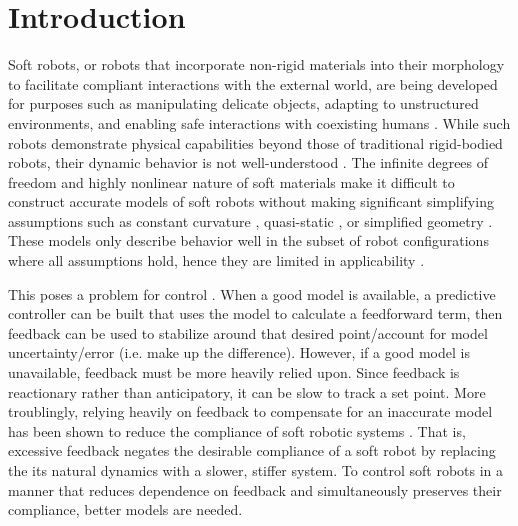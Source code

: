 \section{Introduction}
\label{sec:intro}

Soft robots, or robots that incorporate non-rigid materials into their morphology to facilitate compliant interactions with the external world, are being developed for purposes such as manipulating delicate objects, adapting to unstructured environments, and enabling safe interactions with coexisting humans \cite{rus2015design}.
While such robots demonstrate physical capabilities beyond those of traditional rigid-bodied robots, their dynamic behavior is not well-understood .
The infinite degrees of freedom and highly nonlinear nature of soft materials make it difficult to construct accurate models of soft robots without making significant simplifying assumptions such as constant curvature \cite{rus2015design}, quasi-static \cite{george2018control}, or simplified geometry \cite{bruder2017model} .
These models only describe behavior well in the subset of robot configurations where all assumptions hold, hence they are limited in applicability .

This poses a problem for control .
When a good model is available, a predictive controller can be built that uses the model to calculate a feedforward term, then feedback can be used to stabilize around that desired point/account for model uncertainty/error (i.e. make up the difference).
However, if a good model is unavailable, feedback must be more heavily relied upon.
Since feedback is reactionary rather than anticipatory, it can be slow to track a set point.
More troublingly, relying heavily on feedback to compensate for an inaccurate model has been shown to reduce the compliance of soft robotic systems \cite{della2017controlling}.
That is, excessive feedback negates the desirable compliance of a soft robot by replacing the its natural dynamics with a slower, stiffer system.
To control soft robots in a manner that reduces dependence on feedback and simultaneously preserves their compliance, better models are needed.

